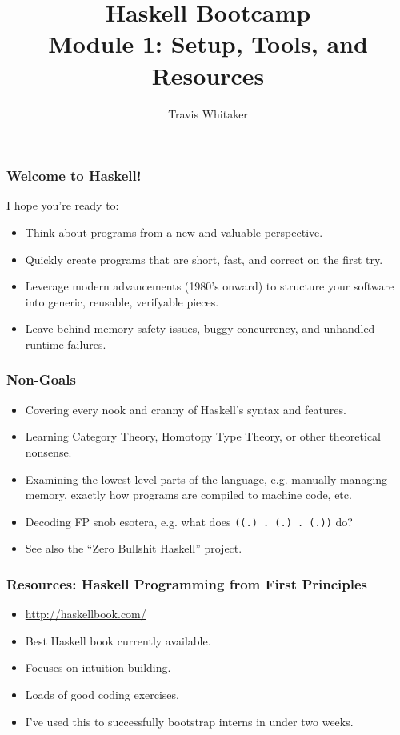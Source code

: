 \documentclass{beamer}
\begin{document}
\title{Haskell Bootcamp \\ Module 1: Setup, Tools, and Resources}
\author{Travis Whitaker}
\date{}

\maketitle

\begin{frame}
\frametitle{Welcome to Haskell!}
I hope you're ready to:
\begin{itemize}
\item Think about programs from a new and valuable perspective.
\item Quickly create programs that are short, fast, and correct on the first
      try.
\item Leverage modern advancements (1980's onward) to structure your software
      into generic, reusable, verifyable pieces.
\item Leave behind memory safety issues, buggy concurrency, and unhandled
      runtime failures.
\end{itemize}
\end{frame}

\begin{frame}
\frametitle{Non-Goals}
\begin{itemize}
\item Covering every nook and cranny of Haskell's syntax and features.
\item Learning Category Theory, Homotopy Type Theory, or other theoretical
      nonsense.
\item Examining the lowest-level parts of the language, e.g. manually managing
      memory, exactly how programs are compiled to machine code, etc.
\item Decoding FP snob esotera, e.g. what does \texttt{((.) . (.) . (.))} do?
\item See also the ``Zero Bullshit Haskell'' project.
\end{itemize}
\end{frame}

\begin{frame}
\frametitle{Resources: Haskell Programming from First Principles}
\begin{itemize}
\item \url{http://haskellbook.com/}
\item Best Haskell book currently available.
\item Focuses on intuition-building.
\item Loads of good coding exercises.
\item I've used this to successfully bootstrap interns in under two weeks.
\end{itemize}
\end{frame}
\end{document}
